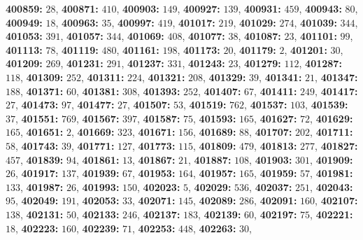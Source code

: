 \textsf{\bfseries 400859:} $28$, \textsf{\bfseries 400871:} $410$, \textsf{\bfseries 400903:} $149$, \textsf{\bfseries 400927:} $139$, \textsf{\bfseries 400931:} $459$, \textsf{\bfseries 400943:} $80$, \textsf{\bfseries 400949:} $18$, \textsf{\bfseries 400963:} $35$, \textsf{\bfseries 400997:} $419$, \textsf{\bfseries 401017:} $219$, \textsf{\bfseries 401029:} $274$, \textsf{\bfseries 401039:} $344$, \textsf{\bfseries 401053:} $391$, \textsf{\bfseries 401057:} $344$, \textsf{\bfseries 401069:} $408$, \textsf{\bfseries 401077:} $38$, \textsf{\bfseries 401087:} $23$, \textsf{\bfseries 401101:} $99$, \textsf{\bfseries 401113:} $78$, \textsf{\bfseries 401119:} $480$, \textsf{\bfseries 401161:} $198$, \textsf{\bfseries 401173:} $20$, \textsf{\bfseries 401179:} $2$, \textsf{\bfseries 401201:} $30$, \textsf{\bfseries 401209:} $269$, \textsf{\bfseries 401231:} $291$, \textsf{\bfseries 401237:} $331$, \textsf{\bfseries 401243:} $23$, \textsf{\bfseries 401279:} $112$, \textsf{\bfseries 401287:} $118$, \textsf{\bfseries 401309:} $252$, \textsf{\bfseries 401311:} $224$, \textsf{\bfseries 401321:} $208$, \textsf{\bfseries 401329:} $39$, \textsf{\bfseries 401341:} $21$, \textsf{\bfseries 401347:} $188$, \textsf{\bfseries 401371:} $60$, \textsf{\bfseries 401381:} $308$, \textsf{\bfseries 401393:} $252$, \textsf{\bfseries 401407:} $67$, \textsf{\bfseries 401411:} $249$, \textsf{\bfseries 401417:} $27$, \textsf{\bfseries 401473:} $97$, \textsf{\bfseries 401477:} $27$, \textsf{\bfseries 401507:} $53$, \textsf{\bfseries 401519:} $762$, \textsf{\bfseries 401537:} $103$, \textsf{\bfseries 401539:} $37$, \textsf{\bfseries 401551:} $769$, \textsf{\bfseries 401567:} $397$, \textsf{\bfseries 401587:} $75$, \textsf{\bfseries 401593:} $165$, \textsf{\bfseries 401627:} $72$, \textsf{\bfseries 401629:} $165$, \textsf{\bfseries 401651:} $2$, \textsf{\bfseries 401669:} $323$, \textsf{\bfseries 401671:} $156$, \textsf{\bfseries 401689:} $88$, \textsf{\bfseries 401707:} $202$, \textsf{\bfseries 401711:} $58$, \textsf{\bfseries 401743:} $39$, \textsf{\bfseries 401771:} $127$, \textsf{\bfseries 401773:} $115$, \textsf{\bfseries 401809:} $479$, \textsf{\bfseries 401813:} $277$, \textsf{\bfseries 401827:} $457$, \textsf{\bfseries 401839:} $94$, \textsf{\bfseries 401861:} $13$, \textsf{\bfseries 401867:} $21$, \textsf{\bfseries 401887:} $108$, \textsf{\bfseries 401903:} $301$, \textsf{\bfseries 401909:} $26$, \textsf{\bfseries 401917:} $137$, \textsf{\bfseries 401939:} $67$, \textsf{\bfseries 401953:} $164$, \textsf{\bfseries 401957:} $165$, \textsf{\bfseries 401959:} $57$, \textsf{\bfseries 401981:} $133$, \textsf{\bfseries 401987:} $26$, \textsf{\bfseries 401993:} $150$, \textsf{\bfseries 402023:} $5$, \textsf{\bfseries 402029:} $536$, \textsf{\bfseries 402037:} $251$, \textsf{\bfseries 402043:} $95$, \textsf{\bfseries 402049:} $191$, \textsf{\bfseries 402053:} $33$, \textsf{\bfseries 402071:} $145$, \textsf{\bfseries 402089:} $286$, \textsf{\bfseries 402091:} $160$, \textsf{\bfseries 402107:} $138$, \textsf{\bfseries 402131:} $50$, \textsf{\bfseries 402133:} $246$, \textsf{\bfseries 402137:} $183$, \textsf{\bfseries 402139:} $60$, \textsf{\bfseries 402197:} $75$, \textsf{\bfseries 402221:} $18$, \textsf{\bfseries 402223:} $160$, \textsf{\bfseries 402239:} $71$, \textsf{\bfseries 402253:} $448$, \textsf{\bfseries 402263:} $30$, 
